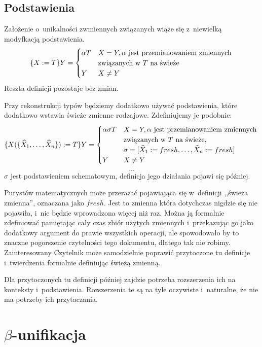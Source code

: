 \documentclass[11pt,leqno]{article}
\begin{document}
\subsection{Podstawienia}

Założenie o~unikalności zwmiennych związanych wiąże się z~niewielką modyfkacją podstawienia.
\[
\{X := T\} Y = 
	\begin{cases}
		\alpha T & X=Y, \alpha \ \textrm{jest przemianowaniem zmiennych} \\
		& \textrm{związanych w~$T$ na świeże} \\
		Y & X \neq Y
	\end{cases} \\
\]
Reszta definicji pozostaje bez zmian.

Przy rekonstrukcji typów będziemy dodatkowo używać podstawienia, które dodatkowo wstawia świeże zmienne rodzajowe.
Zdefiniujemy je podobnie:
\[
\{X(\{\widehat{X}_1, \dots, \widehat{X}_n\}) := T\} Y = 
	\begin{cases}
		\alpha \sigma T & X=Y, \alpha \ \textrm{jest przemianowaniem zmiennych} \\
		& \textrm{związanych w~$T$ na świeże}, \\
		& \sigma = [\widehat{X}_1 := fresh, \dots, \widehat{X}_n := fresh] \\
		Y & X \neq Y
	\end{cases} \\
\]
\[
\ldots
\]
$\sigma$ jest podstawieniem schematowym, definicja jego działania pojawi się później.

Purystów matematycznych może przerażać pojawiająca się w~definicji ,,świeża zmienna'', oznaczana
jako $fresh$. Jest to zmienna która dotychczas nigdzie się nie pojawiła, i~nie będzie wprowadzona więcej niż raz.
Można ją formalnie zdefiniować pamiętając cały czas zbiór użytych zmiennych i~przekazując go jako dodatkowy argument do prawie
wszystkich operacji, ale spowodowało by to znaczne pogorszenie czytelności tego dokumentu, dlatego tak nie robimy.
Zainteresowany Czytelnik może samodzielnie poprawić przytoczone tu definicje i~twierdzenia formalnie definiując świeżą zmienną.

Dla przytoczonych tu definicji później zajdzie potrzeba rozszerzenia ich na konteksty i~podstawienia.
Rozszerzenia te są na tyle oczywiste i~naturalne, że nie ma potrzeby ich przytaczania.

\section{$\beta$-unifikacja}
\end{document}
